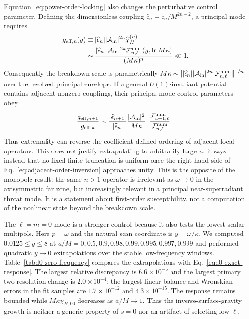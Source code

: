 \documentclass[aps,prd,twocolumn,10pt,nofootinbib,superscriptaddress,floatfix]{revtex4-2}
\begin{document}
Equation~\eqref{eq:power-order-locking} also changes the perturbative control
parameter.  Defining the dimensionless coupling
$\widehat\epsilon_n=\epsilon_n/M^{2n-2}$, a principal mode requires
\begin{align}
 g_{{\rm eff},n}(y)
 &\equiv |\widehat\epsilon_n||{\cal A}_{\rm in}|^{2n}
 \widehat\chi_H^{(n)}\nonumber\\
 &\sim
 \frac{|\widehat\epsilon_n||{\cal A}_{\rm in}|^{2n}
 {\cal F}^{\rm num}_{n,\ell}(y,\ln M\kappa)}
 {(M\kappa)^n}\ll1 .
 \label{eq:power-effective-coupling}
\end{align}
Consequently the breakdown scale is parametrically
$M\kappa\sim[|\widehat\epsilon_n||{\cal A}_{\rm in}|^{2n}
|{\cal F}^{\rm num}_{n,\ell}|]^{1/n}$ over the resolved principal envelope.
If a general $U(1)$-invariant potential contains adjacent nonzero couplings,
their principal-mode control parameters obey
\begin{equation}
 \frac{g_{{\rm eff},n+1}}{g_{{\rm eff},n}}
 \sim
 \frac{|\widehat\epsilon_{n+1}|}{|\widehat\epsilon_n|}
 \frac{|{\cal A}_{\rm in}|^2}{M\kappa}
 \left|\frac{{\cal F}^{\rm num}_{n+1,\ell}}
 {{\cal F}^{\rm num}_{n,\ell}}\right| .
 \label{eq:adjacent-order-inversion}
\end{equation}
Thus extremality can reverse the coefficient-defined ordering of adjacent
local operators.  This does not justify extrapolating to arbitrarily large
$n$: it says instead that no fixed finite truncation is uniform once the
right-hand side of Eq.~\eqref{eq:adjacent-order-inversion} approaches unity.
This is the opposite of the monopole result:
the same $n>1$ operator is irrelevant as $\omega\to0$ in the axisymmetric
far zone, but increasingly relevant in a principal near-superradiant throat
mode.  It is a statement about first-order susceptibility, not a computation
of the nonlinear state beyond the breakdown scale.

The $\ell=m=0$ mode is a stronger control because it also tests the lowest
scalar multipole.  Here $p=\omega$ and the natural scan coordinate is
$y=\omega/\kappa$.  We computed $0.0125\le y\le8$ at
$a/M=0,0.5,0.9,0.98,0.99,0.995,0.997,0.999$ and performed quadratic
$y\to0$ extrapolations over the stable low-frequency windows.
Table~\ref{tab:l0-zero-frequency} compares the extrapolations with
Eq.~\eqref{eq:l0-exact-response}.  The largest relative discrepancy is
$6.6\times10^{-5}$ and the largest primary two-resolution change is
$2.0\times10^{-4}$; the largest linear-balance and Wronskian errors in the
fit samples are $1.7\times10^{-12}$ and $4.3\times10^{-15}$.
The response remains bounded while $M\kappa\chi_{H,00}$ decreases as
$a/M\to1$.  Thus the inverse-surface-gravity growth is neither a generic
property of $s=0$ nor an artifact of selecting low $\ell$.
\end{document}
